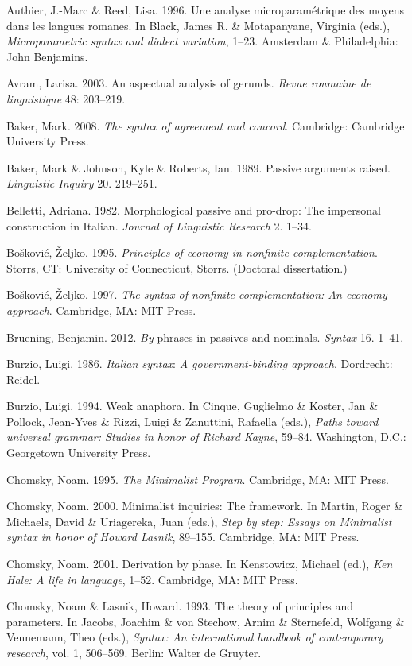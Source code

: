 \documentclass[output=paper]{langsci/langscibook}
\begin{document}
Authier, J.-Marc \& Reed, Lisa. 1996. Une analyse microparamétrique des moyens dans les langues romanes. In Black, James R. \& Motapanyane, Virginia (eds.), \textit{Microparametric syntax and dialect variation}, 1–23. Amsterdam \& Philadelphia: John Benjamins.

Avram, Larisa. 2003. An aspectual analysis of gerunds. \textit{Revue roumaine de linguistique} 48: 203–219.

Baker, Mark. 2008. \textit{The syntax of agreement and concord}. Cambridge: Cambridge University Press.

Baker, Mark \& Johnson, Kyle \& Roberts, Ian. 1989. Passive arguments raised. \textit{Linguistic Inquiry} 20. 219–251.

Belletti, Adriana. 1982. Morphological passive and pro-drop: The impersonal construction in Italian. \textit{Journal of Linguistic Research} 2. 1–34.

Bošković, Željko. 1995. \textit{Principles of economy in nonfinite complementation}. Storrs, CT: University of Connecticut, Storrs. (Doctoral dissertation.)

Bošković, Željko. 1997. \textit{The syntax of nonfinite complementation: An economy approach}. Cambridge, MA: MIT Press.

Bruening, Benjamin. 2012. \textit{By} phrases in passives and nominals. \textit{Syntax} 16. 1–41.

Burzio, Luigi. 1986. \textit{Italian syntax}: \textit{A government-binding approach}. Dordrecht: Reidel.

Burzio, Luigi. 1994. Weak anaphora. In Cinque, Guglielmo \& Koster, Jan \& Pollock, Jean-Yves \& Rizzi, Luigi \& Zanuttini, Rafaella (eds.), \textit{Paths toward universal grammar: Studies in honor of Richard Kayne}, 59–84. Washington, D.C.: Georgetown University Press.

Chomsky, Noam. 1995. \textit{The Minimalist Program}. Cambridge, MA: MIT Press.

Chomsky, Noam. 2000. Minimalist inquiries: The framework. In Martin, Roger \& Michaels, David \& Uriagereka, Juan (eds.), \textit{Step by step: Essays on Minimalist syntax in honor of Howard Lasnik}, 89–155. Cambridge, MA: MIT Press. 

Chomsky, Noam. 2001. Derivation by phase. In Kenstowicz, Michael (ed.), \textit{Ken Hale: A life in language}, 1–52. Cambridge, MA: MIT Press.

Chomsky, Noam \& Lasnik, Howard. 1993. The theory of principles and parameters. In Jacobs, Joachim \& von Stechow, Arnim \& Sternefeld, Wolfgang \& Vennemann, Theo (eds.), \textit{Syntax: An international handbook of contemporary research}, vol. 1, 506–569. Berlin: Walter de Gruyter.
\end{document}
